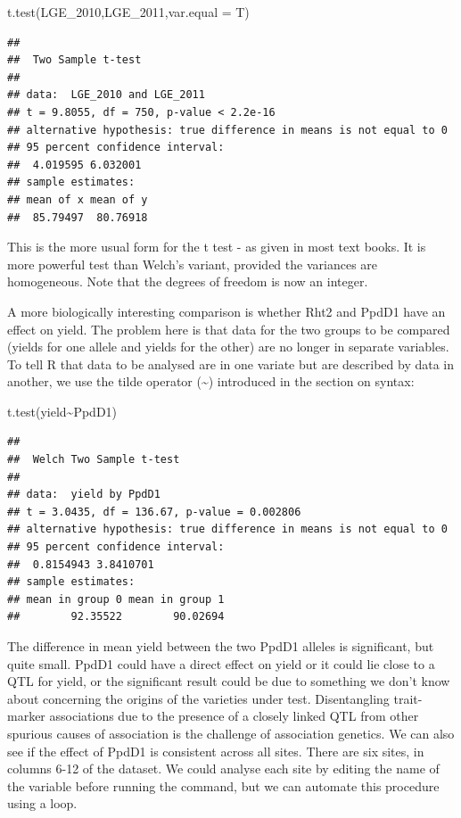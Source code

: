 \documentclass[
]{book}
\newenvironment{Shaded}{\begin{snugshade}}{\end{snugshade}}
\newcommand{\AttributeTok}[1]{\textcolor[rgb]{0.77,0.63,0.00}{#1}}
\newcommand{\FunctionTok}[1]{\textcolor[rgb]{0.00,0.00,0.00}{#1}}
\newcommand{\NormalTok}[1]{#1}
\newcommand{\SpecialCharTok}[1]{\textcolor[rgb]{0.00,0.00,0.00}{#1}}
\begin{document}
\begin{Shaded}
\begin{Highlighting}[]
\FunctionTok{t.test}\NormalTok{(LGE\_2010,LGE\_2011,}\AttributeTok{var.equal =}\NormalTok{ T)}
\end{Highlighting}
\end{Shaded}

\begin{verbatim}
## 
##  Two Sample t-test
## 
## data:  LGE_2010 and LGE_2011
## t = 9.8055, df = 750, p-value < 2.2e-16
## alternative hypothesis: true difference in means is not equal to 0
## 95 percent confidence interval:
##  4.019595 6.032001
## sample estimates:
## mean of x mean of y 
##  85.79497  80.76918
\end{verbatim}

This is the more usual form for the t test - as given in most text books. It is more powerful test than Welch's variant, provided the variances are homogeneous. Note that the degrees of freedom is now an integer.

A more biologically interesting comparison is whether Rht2 and PpdD1 have an effect on yield. The problem here is that data for the two groups to be compared (yields for one allele and yields for the other) are no longer in separate variables. To tell R that data to be analysed are in one variate but are described by data in another, we use the tilde operator (\textasciitilde) introduced in the section on syntax:

\begin{Shaded}
\begin{Highlighting}[]
\FunctionTok{t.test}\NormalTok{(yield}\SpecialCharTok{\textasciitilde{}}\NormalTok{PpdD1)}
\end{Highlighting}
\end{Shaded}

\begin{verbatim}
## 
##  Welch Two Sample t-test
## 
## data:  yield by PpdD1
## t = 3.0435, df = 136.67, p-value = 0.002806
## alternative hypothesis: true difference in means is not equal to 0
## 95 percent confidence interval:
##  0.8154943 3.8410701
## sample estimates:
## mean in group 0 mean in group 1 
##        92.35522        90.02694
\end{verbatim}

The difference in mean yield between the two PpdD1 alleles is significant, but quite small. PpdD1 could have a direct effect on yield or it could lie close to a QTL for yield, or the significant result could be due to something we don't know about concerning the origins of the varieties under test. Disentangling trait-marker associations due to the presence of a closely linked QTL from other spurious causes of association is the challenge of association genetics. We can also see if the effect of PpdD1 is consistent across all sites. There are six sites, in columns 6-12 of the dataset. We could analyse each site by editing the name of the variable before running the command, but we can automate this procedure using a loop.
\end{document}
